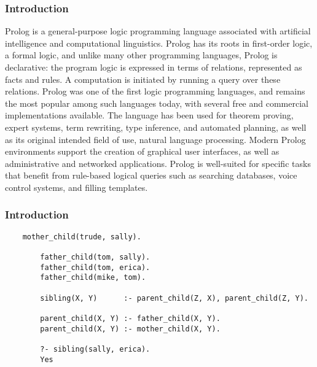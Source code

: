 \begin{frame}
    \frametitle{Introduction}
    \begin{minipage}{\textwidth}
        Prolog is a general-purpose logic programming language associated with artificial intelligence and computational linguistics.
        Prolog has its roots in first-order logic, a formal logic, and unlike many other programming languages, Prolog is declarative: the program logic is expressed in terms of relations, represented as facts and rules. A computation is initiated by running a query over these relations.
        Prolog was one of the first logic programming languages, and remains the most popular among such languages today, with several free and commercial implementations available. The language has been used for theorem proving, expert systems, term rewriting, type inference, and automated planning, as well as its original intended field of use, natural language processing. Modern Prolog environments support the creation of graphical user interfaces, as well as administrative and networked applications.
        Prolog is well-suited for specific tasks that benefit from rule-based logical queries such as searching databases, voice control systems, and filling templates.
    \end{minipage}
\end{frame}

\begin{frame}[fragile]
    \frametitle{Introduction}
    \begin{minipage}{\textwidth}
\begin{lstlisting}
    mother_child(trude, sally).
        
        father_child(tom, sally).
        father_child(tom, erica).
        father_child(mike, tom).
        
        sibling(X, Y)      :- parent_child(Z, X), parent_child(Z, Y).
        
        parent_child(X, Y) :- father_child(X, Y).
        parent_child(X, Y) :- mother_child(X, Y).

        ?- sibling(sally, erica).
        Yes    
\end{lstlisting}
    \end{minipage}
\end{frame}

